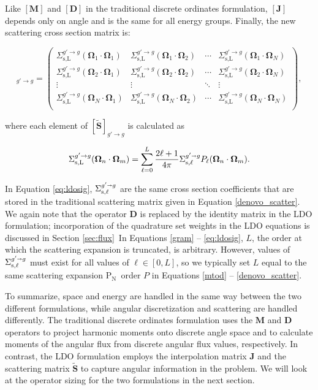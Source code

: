 \documentclass{article} %
\newcommand{\sa}{\shortrightarrow}
\newcommand{\bo}{\mathbf\Omega}
\newcommand{\pn}{P$_\mathrm{N}$}
\newcommand{\ve}[1]{\ensuremath{\mathbf{#1}}}
\newcommand{\Sigg}[1]{\ensuremath{\Sigma^{g'\sa g}_{\text{s},#1}}}
\newcommand{\Sij}[2]{\Sigma^{g'\rightarrow g}_{\text{s,L}}(\bo_#1\cdot\bo_#2)}
\begin{document}
\noindent Like $[\ve{M}]$ and $[\ve{D}]$ in the traditional discrete ordinates
formulation, $[\ve{J}]$ depends only on angle and is the same for all 
energy groups. Finally, the new scattering cross section matrix is:

\begin{equation}
  [\ve{\tilde{S}}]_{g'\rightarrow g} = \begin{pmatrix}
    \Sij{1}{1} & \Sij{1}{2} & \cdots & \Sij{1}{N} \\
    \Sij{2}{1} & \Sij{2}{2} & \cdots & \Sij{2}{N} \\
    \vdots     & \vdots     & \ddots & \vdots     \\
    \Sij{N}{1} & \Sij{N}{2} & \cdots & \Sij{N}{N} \\
  \end{pmatrix},
\label{ldo_scatter}
\end{equation}

\noindent where each element of $[\ve{\tilde{S}}]_{g'\rightarrow g}$ is
calculated as

\begin{equation}
\Sij{n}{m} = \sum_{\ell=0}^L \frac{2\ell +1}{4\pi}\Sigg{\ell}
P_{\ell}(\bo_n \cdot\bo_m).
\label{eq:ldosig}
\end{equation}

\noindent In Equation \ref{eq:ldosig}, $\Sigg{\ell}$ are the same cross section 
coefficients that are stored in the traditional scattering matrix given in
Equation \ref{denovo_scatter}. We again note that the operator $\ve{D}$ is
replaced by the identity matrix in the LDO formulation; incorporation of the
quadrature set weights in the LDO equations is 
discussed in Section \ref{sec:flux}\ In Equations
\ref{gram} -- \ref{eq:ldosig}, $L$, the order at which the scattering expansion
is truncated, is arbitrary. However, values of $\Sigg{\ell}$ must exist for all
values of $\ell \in [0,L]$, so we typically set $L$ equal to the same 
scattering expansion \pn\ order $P$ in Equations
\ref{mtod} -- \ref{denovo_scatter}.

To summarize, space and energy are handled in the same way between the two
different formulations, while angular discretization and scattering are handled
differently. The traditional discrete ordinates formulation uses the $\ve{M}$
and $\ve{D}$ operators to project harmonic moments onto discrete angle space
and to calculate moments of the angular flux from discrete angular flux values,
respectively. In contrast, the LDO formulation employs the interpolation matrix
$\ve{J}$ and the scattering matrix $\ve{\tilde{S}}$ to capture angular
information in the problem. We will look at the
operator sizing for the two formulations in the next section.
\end{document}
